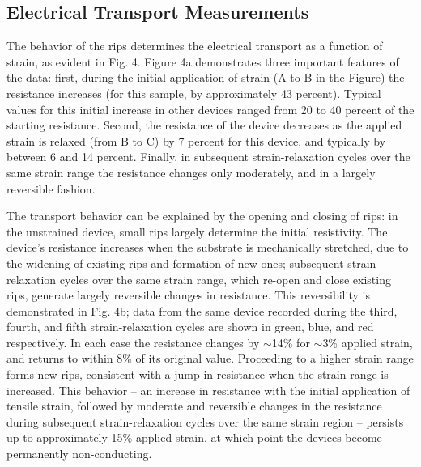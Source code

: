 \documentclass[%
 aps,
 pra,
 longbibliography,
 amsmath,amssymb,
 reprint,
 superscriptaddress,
]{revtex4-1}
\begin{document}
\subsection{Electrical Transport Measurements}
The behavior of the rips determines the electrical transport as a function of
strain, as evident in Fig. 4. Figure 4a demonstrates three important features
of the data: first, during the initial application of strain (A to B in the
Figure) the resistance increases (for this sample, by approximately 43
percent). Typical values for this initial increase in other devices ranged from
20 to 40 percent of the starting resistance. Second, the resistance of the
device decreases as the applied strain is relaxed (from B to C) by 7 percent
for this device, and typically by between 6 and 14 percent. Finally, in
subsequent strain-relaxation cycles over the same strain range the resistance
changes only moderately, and in a largely reversible fashion.

The transport behavior can be explained by the opening and closing of rips: in
the unstrained device, small rips largely determine the initial resistivity.
The device's resistance increases when the substrate is mechanically stretched,
due to the widening of existing rips and formation of new ones; subsequent
strain-relaxation cycles over the same strain range, which re-open and close
existing rips, generate largely reversible changes in resistance. This
reversibility is demonstrated in Fig. 4b; data from the same device recorded
during the third, fourth, and fifth strain-relaxation cycles are shown in
green, blue, and red respectively. In each case the resistance changes by
$\sim$14\% for $\sim$3\% applied strain, and returns to within 8\% of its
original value. Proceeding to a higher strain range forms new rips, consistent
with a jump in resistance when the strain range is increased. This behavior --
an increase in resistance with the initial application of tensile strain,
followed by moderate and reversible changes in the resistance during subsequent
strain-relaxation cycles over the same strain region -- persists up to
approximately 15\% applied strain, at which point the devices become
permanently non-conducting.
\end{document}
